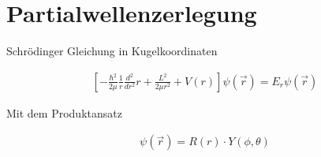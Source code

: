 
\usepackage{amsmath}                %
\usepackage{amsfonts}



\section*{Partialwellenzerlegung}


Schrödinger Gleichung in Kugelkoordinaten




\begin{align}
  \label{eq:2}
    \left[-\frac{\hbar^2}{2\mu}\frac{1}{r}\frac{d^2}{dr^2}r + \frac{L^2}{2\mu r^2}  + V(r) \right]\psi(\vec r) = E_r\psi(\vec r) 
\end{align}

Mit dem Produktansatz

\begin{align}
  \label{eq:3}
  \psi(\vec r) = R(r)\cdot Y(\phi,\theta) 
\end{align}




